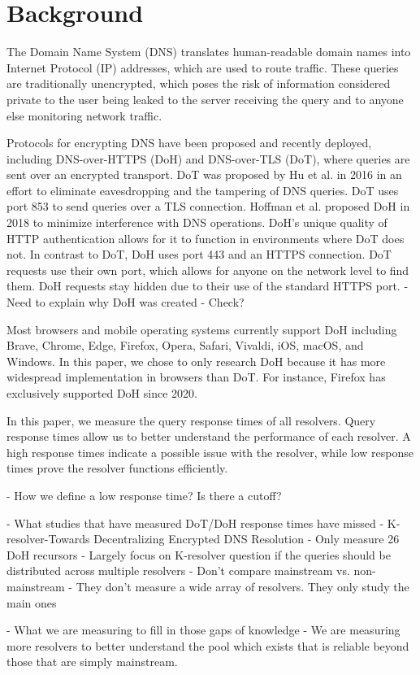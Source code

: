 \section{Background}\label{sec:back}

The Domain Name System (DNS) translates human-readable domain names into Internet Protocol (IP) addresses, which are used to route traffic. 
These queries are traditionally unencrypted, which poses the risk of information considered private to the user being leaked to the server receiving the query and to anyone else monitoring network traffic.

Protocols for encrypting DNS have been proposed and recently deployed, including DNS-over-HTTPS (DoH) and DNS-over-TLS (DoT), where queries are sent over an encrypted transport.
DoT was proposed by Hu et al. in 2016 in an effort to eliminate eavesdropping and the tampering of DNS queries. 
DoT uses port 853 to send queries over a TLS connection. 
Hoffman et al. proposed DoH in 2018 to minimize interference with DNS operations. 
DoH's unique quality of HTTP authentication allows for it to function in environments where DoT does not. 
In contrast to DoT, DoH uses port 443 and an HTTPS connection. 
DoT requests use their own port, which allows for anyone on the network level to find them. 
DoH requests stay hidden due to their use of the standard HTTPS port. 
	- Need to explain why DoH was created - Check?

Most browsers and mobile operating systems currently support DoH including Brave, Chrome, Edge, Firefox, Opera, Safari, Vivaldi, iOS, macOS, and Windows. 
In this paper, we chose to only research DoH because it has more widespread implementation in browsers than DoT.
For instance, Firefox has exclusively supported DoH since 2020. 

In this paper, we measure the query response times of all resolvers. 
Query response times allow us to better understand the performance of each resolver. 
A high response times indicate a possible issue with the resolver, while low response times prove the resolver functions efficiently. 

- How we define a low response time? Is there a cutoff?


- What studies that have measured DoT/DoH response times have missed
	- K-resolver-Towards Decentralizing Encrypted DNS Resolution
		- Only measure 26 DoH recursors
		- Largely focus on K-resolver question if the queries should be distributed across multiple resolvers
		- Don't compare mainstream vs. non-mainstream
	- They don't measure a wide array of resolvers. They only study the main ones 


- What we are measuring to fill in those gaps of knowledge
	- We are measuring more resolvers to better understand the pool which exists that is reliable beyond those that are simply mainstream. 
